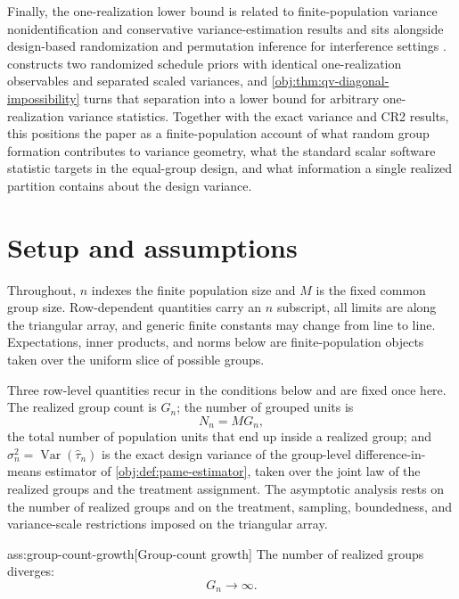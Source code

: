 \documentclass[11pt]{article}
\begin{document}
Finally, the one-realization lower bound is related to finite-population variance nonidentification and conservative variance-estimation results \citep{AronowGreenLee2014,BasseAiroldi2018,HarshawMiddletonSavje2026,ParkWager2026} and sits alongside design-based randomization and permutation inference for interference settings \citep{BasseDingFellerToulis2024,PuelzBasseFellerToulis2022}.  constructs two randomized schedule priors with identical one-realization observables and separated scaled variances, and \cref{obj:thm:qv-diagonal-impossibility} turns that separation into a lower bound for arbitrary one-realization variance statistics. Together with the exact variance and CR2 results, this positions the paper as a finite-population account of what random group formation contributes to variance geometry, what the standard scalar software statistic targets in the equal-group design, and what information a single realized partition contains about the design variance.


\section{Setup and assumptions}\label{sec:setup}

Throughout, \(n\) indexes the finite population size and \(M\) is the fixed common group size. Row-dependent quantities carry an \(n\) subscript, all limits are along the triangular array, and generic finite constants may change from line to line. Expectations, inner products, and norms below are finite-population objects taken over the uniform slice of possible groups.

Three row-level quantities recur in the conditions below and are fixed once here. The realized group count is \(G_n\); the number of grouped units is
\[
N_n=MG_n,
\]
the total number of population units that end up inside a realized group; and \(\sigma_n^2=\operatorname{Var}(\widehat\tau_n)\) is the exact design variance of the group-level difference-in-means estimator of \cref{obj:def:pame-estimator}, taken over the joint law of the realized groups and the treatment assignment. The asymptotic analysis rests on the number of realized groups and on the treatment, sampling, boundedness, and variance-scale restrictions imposed on the triangular array.

\begin{assumptionv}{ass:group-count-growth}[Group-count growth]
The number of realized groups diverges:
\[
G_n \to \infty .
\]
\end{assumptionv}
\end{document}
